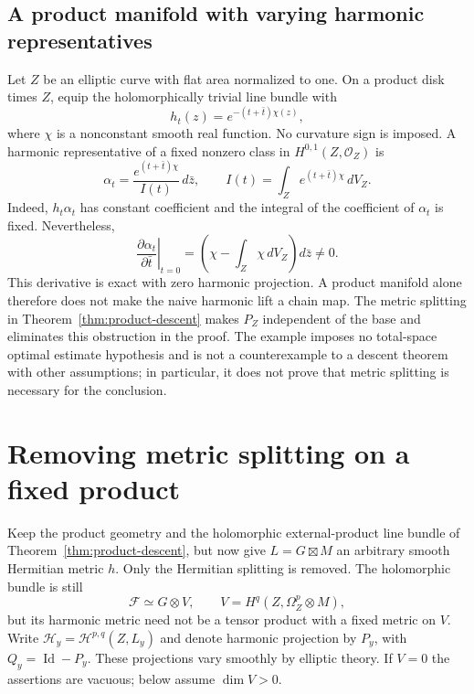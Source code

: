 \documentclass[11pt,reqno]{amsart}
\numberwithin{equation}{section}
\theoremstyle{definition}
\theoremstyle{remark}
\newcommand{\cH}{\mathcal H}
\newcommand{\cF}{\mathcal F}
\newcommand{\Id}{\operatorname{Id}}
\newcommand{\cO}{\mathcal O}
\begin{document}
\subsection{A product manifold with varying harmonic representatives}
Let $Z$ be an elliptic curve with flat area normalized to one. On a product disk times $Z$, equip the holomorphically trivial line bundle with
\[
 h_t(z)=e^{-(t+\bar t)\chi(z)},
\]
where $\chi$ is a nonconstant smooth real function. No curvature sign is imposed. A harmonic representative of a fixed nonzero class in $H^{0,1}(Z,\cO_Z)$ is
\[
 \alpha_t=\frac{e^{(t+\bar t)\chi}}{I(t)}\,d\bar z,
 \qquad I(t)=\int_Ze^{(t+\bar t)\chi}\,dV_Z.
\]
Indeed, $h_t\alpha_t$ has constant coefficient and the integral of the coefficient of $\alpha_t$ is fixed. Nevertheless,
\[
 \left.\frac{\partial\alpha_t}{\partial\bar t}\right|_{t=0}
 =\left(\chi-\int_Z\chi\,dV_Z\right)d\bar z\ne0.
\]
This derivative is exact with zero harmonic projection. A product manifold alone therefore does not make the naive harmonic lift a chain map. The metric splitting in Theorem~\ref{thm:product-descent} makes $P_Z$ independent of the base and eliminates this obstruction in the proof. The example imposes no total-space optimal estimate hypothesis and is not a counterexample to a descent theorem with other assumptions; in particular, it does not prove that metric splitting is necessary for the conclusion.

\section{Removing metric splitting on a fixed product}\label{sec:variable-metric}

Keep the product geometry and the holomorphic external-product line bundle of Theorem~\ref{thm:product-descent}, but now give $L=G\boxtimes M$ an arbitrary smooth Hermitian metric $h$. Only the Hermitian splitting is removed. The holomorphic bundle is still
\[
 \cF\simeq G\otimes V,\qquad
 V=H^q(Z,\Omega_Z^p\otimes M),
\]
but its harmonic metric need not be a tensor product with a fixed metric on $V$. Write $\mathcal H_y=\cH^{p,q}(Z,L_y)$ and denote harmonic projection by $P_y$, with $Q_y=\Id-P_y$. These projections vary smoothly by elliptic theory. If $V=0$ the assertions are vacuous; below assume $\dim V>0$.
\end{document}

